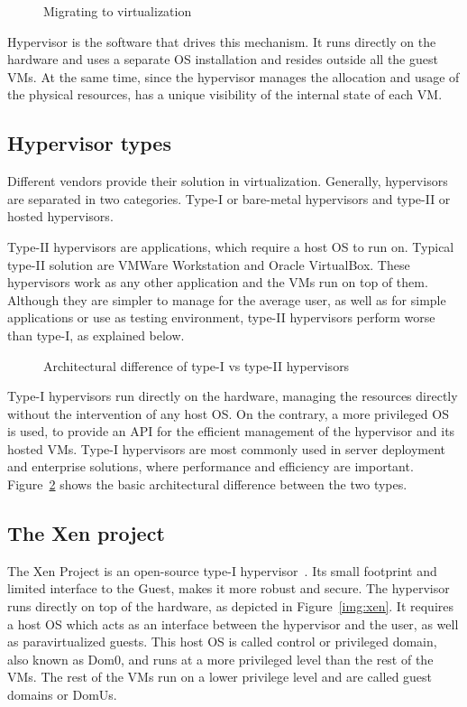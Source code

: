 \begin{figure}
	\centering
	
	\caption{Migrating to virtualization}
	\label{fig:tovirt}
\end{figure}

Hypervisor is the software that drives this mechanism. It runs directly on the hardware and uses a separate \ac{OS} installation and resides outside all the guest \ac{VM}s. At the same time, since the hypervisor manages the allocation and usage of the physical resources, has a unique visibility of the internal state of each \ac{VM}. 
\subsection{Hypervisor types}\label{sub:hyptypes}
Different vendors provide their solution in virtualization. Generally, hypervisors are separated in two categories. Type-I or bare-metal hypervisors and type-II or hosted hypervisors.
\par Type-II hypervisors are applications, which require a host \ac{OS} to run on. Typical type-II solution are VMWare Workstation and Oracle VirtualBox. These hypervisors work as any other application and the \ac{VM}s run on top of them. Although they are simpler to manage for the average user, as well as for simple applications or use as testing environment, type-II hypervisors perform worse than type-I, as explained below. 

\begin{figure}
	\centering
	
	\caption{Architectural difference of type-I vs type-II hypervisors}
	\label{fig:hyptypes}
\end{figure}

\par Type-I hypervisors run directly on the hardware, managing the resources directly without the intervention of any host \ac{OS}. On the contrary, a more privileged \ac{OS} is used, to provide an \ac{API} for the efficient management of the hypervisor and its hosted \ac{VM}s. Type-I hypervisors are most commonly used in server deployment and enterprise solutions, where performance and efficiency are important. Figure~\ref{fig:hyptypes} shows the basic architectural difference between the two types.

\subsection{The Xen project}\label{sub:xen}
The Xen Project is an open-source type-I hypervisor~\cite{xen}. Its small footprint and limited interface to the Guest, makes it more robust and secure. The hypervisor runs directly on top of the hardware, as depicted in Figure~\ref{img:xen}. It requires a host \ac{OS} which acts as an interface between the hypervisor and the user, as well as paravirtualized guests. This host \ac{OS} is called control or privileged domain, also known as Dom0, and runs at a more privileged level than the rest of the \ac{VM}s. The rest of the \ac{VM}s run on a lower privilege level and are called guest domains or DomUs. 

